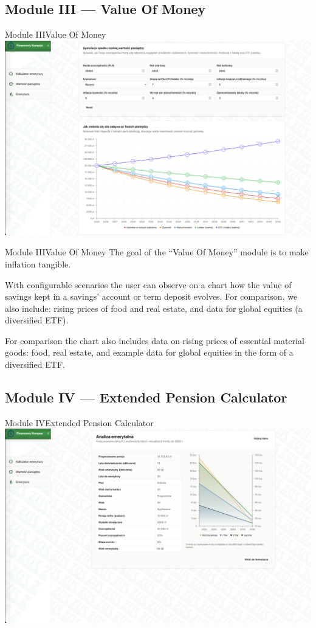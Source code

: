 \subsection{Module III --- Value Of Money}

\begin{frame}[t]{Module III}{Value Of Money}
  \includegraphics[width=.8\textwidth]{img/module_3_the_value_of_money}
\end{frame}

\begin{frame}[t]{Module III}{Value Of Money}
The goal of the “Value Of Money” module is to make inflation tangible.

\pause
With configurable scenarios the user can observe on a chart
how the value of savings kept in a savings' account or term deposit evolves.
\pause
For comparison, we also include: rising prices of food and real estate,
and data for global equities (a diversified ETF).


\pause For comparison the chart also includes data on
rising prices of essential material goods: food, real estate,
and example data for global equities in the form of a diversified ETF.
\end{frame}

\subsection{Module IV --- Extended Pension Calculator}

\begin{frame}[t]{Module IV}{Extended Pension Calculator}
  \includegraphics[width=.8\textwidth]{img/module_4_extended_pension_calculator}
\end{frame}

